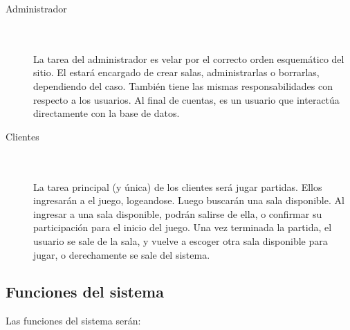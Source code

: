 \documentclass[a4paper,11pt]{article}
\begin{document}
\begin{description}
	\item[Administrador] \hfill \\ \\
	La tarea del administrador es velar por el correcto orden esquemático
	del sitio. El estará encargado de crear salas, administrarlas o 
	borrarlas, dependiendo del caso. También tiene las mismas 
	responsabilidades con respecto a los usuarios. Al final de cuentas,
	es un usuario que interactúa directamente con la base de datos.

	\item[Clientes] \hfill \\ \\
	La tarea principal (y única) de los clientes será jugar partidas. Ellos
	ingresarán a el juego, logeandose. Luego buscarán una sala disponible.
	Al ingresar a una sala disponible, podrán salirse de ella, o confirmar
	su participación para el inicio del juego. Una vez terminada la partida,
	el usuario se sale de la sala, y vuelve a escoger otra sala disponible
	para jugar, o derechamente se sale del sistema.
	
\end{description}
\newpage
	

\subsection{Funciones del sistema}
Las funciones del sistema serán:\\
\end{document}
